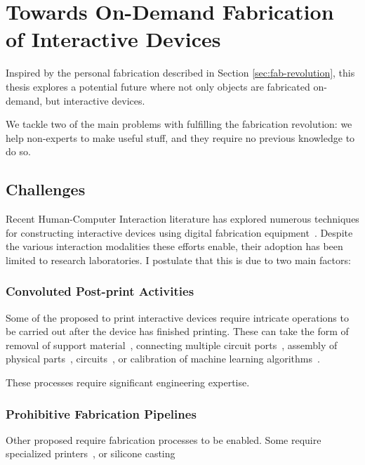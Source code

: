   \section{Towards On-Demand Fabrication of Interactive Devices}
    Inspired by the personal fabrication  described in Section
    \ref{sec:fab-revolution}, this thesis explores a potential future where
    not only objects are fabricated on-demand, but interactive devices.


    We tackle two of the main problems with fulfilling the fabrication
    revolution: we help non-experts to make useful stuff, and they require no
    previous knowledge to do so.

    \subsection{Challenges}
      Recent Human-Computer Interaction literature has explored numerous
      techniques for constructing interactive devices using digital fabrication
      equipment~\cite{Ballagas:2018}. Despite the various interaction modalities
      these efforts enable, their adoption has been limited to research
      laboratories. I postulate that this is due to two main factors:

        \subsubsection*{Convoluted Post-print Activities}
          Some of the proposed  to print interactive devices
          require intricate operations to be carried out after the device has
          finished printing. These can take the form of removal of support
          material~\cite{Laput:2015}, connecting multiple circuit
          ports~\cite{Schmitz:2019}, assembly of physical
          parts~\cite{Savage:2015}, circuits~\cite{Murray-Smith:2008}, or
          calibration of machine learning algorithms~\cite{Ono:2013}.

          These processes require significant engineering expertise.

        \subsubsection*{Prohibitive Fabrication Pipelines}
          Other proposed  require  fabrication
          processes to be enabled. Some require specialized printers~\cite{}, or
          silicone casting~\cite{He:2017}

